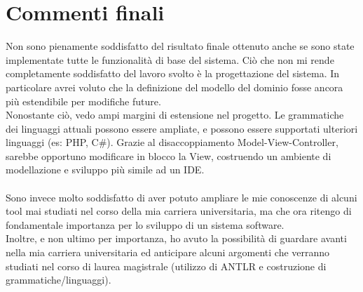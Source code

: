 \documentclass{article}
\begin{document}
  \section{Commenti finali}
  Non sono pienamente soddisfatto del risultato finale ottenuto anche se sono state implementate tutte le funzionalità di base del sistema. Ciò che non mi rende
  completamente soddisfatto del lavoro svolto è la progettazione del sistema. In particolare avrei voluto che la definizione del modello del dominio fosse
  ancora più estendibile per modifiche future.\\
  Nonostante ciò, vedo ampi margini di estensione nel progetto. Le grammatiche dei linguaggi attuali possono essere ampliate, e possono essere supportati ulteriori
  linguaggi (es: PHP, C\#). Grazie al disaccoppiamento Model-View-Controller, sarebbe opportuno modificare in blocco la View, costruendo un ambiente di modellazione e sviluppo
  più simile ad un IDE.\\
  \\Sono invece molto soddisfatto di aver potuto ampliare le mie conoscenze di alcuni tool mai studiati nel corso della mia carriera universitaria, ma che ora
  ritengo di fondamentale importanza per lo sviluppo di un sistema software.\\
  Inoltre, e non ultimo per importanza, ho avuto la possibilità di guardare avanti nella mia carriera universitaria ed anticipare alcuni argomenti che verranno
  studiati nel corso di laurea magistrale (utilizzo di ANTLR e costruzione di grammatiche/linguaggi).
  \clearpage
\end{document}
